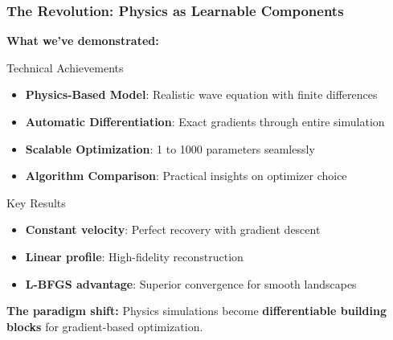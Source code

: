 \documentclass[notes]{beamer}
\begin{document}
\begin{frame}
\frametitle{The Revolution: Physics as Learnable Components}

\textbf{What we've demonstrated:}

\begin{block}{Technical Achievements}
\begin{itemize}
    \item \textbf{Physics-Based Model}: Realistic wave equation with finite differences
    \item \textbf{Automatic Differentiation}: Exact gradients through entire simulation
    \item \textbf{Scalable Optimization}: 1 to 1000 parameters seamlessly
    \item \textbf{Algorithm Comparison}: Practical insights on optimizer choice
\end{itemize}
\end{block}

\begin{block}{Key Results}
\begin{itemize}
    \item \textbf{Constant velocity}: Perfect recovery with gradient descent
    \item \textbf{Linear profile}: High-fidelity reconstruction 
    \item \textbf{L-BFGS advantage}: Superior convergence for smooth landscapes
\end{itemize}
\end{block}

\textbf{The paradigm shift:} Physics simulations become \textbf{differentiable building blocks} for gradient-based optimization.

\end{frame}
\end{document}
